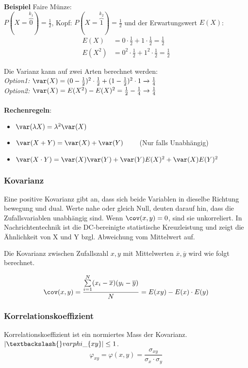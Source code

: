 \noindent\textbf{Beispiel} Faire Münze:\\
$P(X = \overbrace{0}^{k_1}) = \frac{1}{2}$, Kopf: $P(X = \overbrace{1}^{k_2}) = \frac{1}{2}$ und der Erwartungswert $E(X)$: 
\begin{align*}
	E(X) &= 0\cdot \frac{1}{2} + 1\cdot\frac{1}{2} = \frac{1}{2} \\
	E(X^2) &= 0^2\cdot \frac{1}{2} + 1^2\cdot\frac{1}{2} = \frac{1}{2}
\end{align*}

\noindent Die Varianz kann auf zwei Arten berechnet werden:\\
\textit{Option1:} $\var(X) = (0 - \frac{1}{2})^2 \cdot \frac{1}{2} + (1 - \frac{1}{2})^2 \cdot 1 \xrightarrow{} \frac{1}{4}$\\
\textit{Option2:} $\var(X) = E(X^2) - E(X)^2 = \frac{1}{2} - \frac{1}{4} \rightarrow \frac{1}{4}$
\\ ~\\
\noindent\textbf{Rechenregeln}:
\begin{itemize}[nosep]
	\item $\var(\lambda X) = \lambda^2\var(X)$
	\item $\var(X + Y) = \var(X) + \var(Y) \qquad$ (Nur falls Unabhängig)
	\item $\var(X\cdot Y) = \var(X)\var(Y) + \var(Y)E(X)^2 + \var(X)E(Y)^2$
\end{itemize}

\subsubsection{Kovarianz}
Eine positive Kovarianz gibt an, dass sich beide Variablen in dieselbe Richtung bewegung und dual. Werte nahe oder gleich Null, deuten darauf hin, dass die Zufallsvariablen unabhängig sind. Wenn $\cov(x, y) = 0$, sind sie unkorreliert. In Nachrichtentechnik ist die DC-bereinigte statistische Kreuzleistung und zeigt die Ähnlichkeit von X und Y bzgl. Abweichung vom Mittelwert auf.

Die Kovarianz zwischen Zufallszahl $x,y$ mit Mittelwerten $\overline{x}, \overline{y}$ wird wie folgt berechnet.

\[
\cov(x,y) = \frac{\sum\limits_{i=1}^{N}(x_i - \overline{x})(y_i - \overline{y})}{N} = E(xy) - E(x)\cdot E(y)
\]

\subsubsection{Korrelationskoeffizient}
Korrelationskoeffizient ist ein normiertes Mass der Kovarianz. $\left|\textbackslash{}varphi\_\{xy\}\right| \leq 1$.
\[
\varphi_{xy} = \varphi(x, y) = \frac{\sigma_{xy}}{\sigma_x \cdot \sigma_y}
\]

